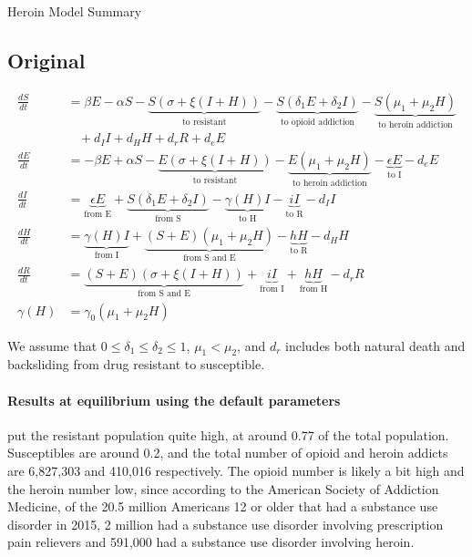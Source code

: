 \documentclass[11pt]{report}
\begin{document}
\begin{center}
{\Huge Heroin Model Summary}\\	
\end{center}
\vspace{1in}

\subsection*{Original}

\begin{align*}
	\frac{dS}{dt} &= \beta E - \alpha S - \underbrace{S(\sigma + \xi(I+H))}_{\text{to resistant}} - \underbrace{S(\delta_1 E + \delta_2 I)}_{\text{to opioid addiction}} - \underbrace{S(\mu_1+\mu_2H)}_{\text{to heroin addiction}}\\
	&\ \ \ \ + d_I I + d_H H + d_r R + d_e E\\
	\frac{dE}{dt} &= - \beta E + \alpha S - \underbrace{E(\sigma + \xi(I+H))}_{\text{to resistant}} - \underbrace{E(\mu_1 + \mu_2H)}_{\text{to heroin addiction}} - \underbrace{\epsilon E}_{\text{to I}} - d_e E\\
	\frac{dI}{dt} &= \underbrace{\epsilon E}_{\text{from E}} + \underbrace{S(\delta_1E+\delta_2I)}_{\text{from S}} - \underbrace{\gamma(H)I}_{\text{to H}} - \underbrace{iI}_{\text{to R}} - d_II\\
	\frac{dH}{dt} &= \underbrace{\gamma(H)I}_{\text{from I}} + \underbrace{(S+E)(\mu_1+\mu_2H)}_{\text{from S and E}} - \underbrace{hH}_{\text{to R}} - d_HH\\
	\frac{dR}{dt} &= \underbrace{(S+E)(\sigma + \xi(I+H))}_{\text{from S and E}} + \underbrace{iI}_{\text{from I}} + \underbrace{hH}_{\text{from H}} -d_rR\\
	\gamma(H) &= \gamma_0(\mu_1+\mu_2H)
\end{align*}

We assume that $0\leq\delta_1\leq\delta_2\leq 1$, $\mu_1<\mu_2$, and $d_r$ includes both natural death and backsliding from drug resistant to susceptible.

\paragraph{Results at equilibrium using the default parameters} put the resistant population quite high, at around 0.77 of the total population. Susceptibles are around 0.2, and the total number of opioid and heroin addicts are 6,827,303 and 410,016 respectively. The opioid number is likely a bit high and the heroin number low, since according to the American Society of Addiction Medicine, of the 20.5 million Americans 12 or older that had a substance use disorder in 2015, 2 million had a substance use disorder involving prescription pain relievers and 591,000 had a substance use disorder involving heroin.
\end{document}
